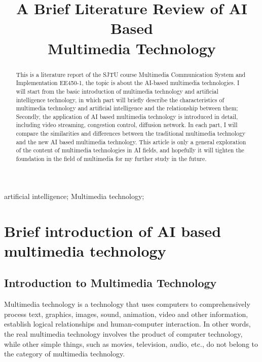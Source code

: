 \documentclass[conference]{IEEEtran}
\begin{document}
\title{A Brief Literature Review of AI Based\\ Multimedia Technology}
\author{

}

\maketitle
\thispagestyle{fancy} 
\lhead{} %
\chead{} %
\rhead{} %
\lfoot{} %
\cfoot{\thepage} %
\rfoot{} %
\renewcommand{\headrulewidth}{0pt} %
\renewcommand{\footrulewidth}{0pt} %
\pagestyle{fancy}
\cfoot{\thepage}

\begin{abstract}
This is a literature report of the SJTU course Multimedia Communication System and Implementation EE450-1, the topic is about the AI-based multimedia technologies. I will start from the basic introduction of multimedia technology and artificial intelligence technology, in which part will briefly describe the characteristics of multimedia technology and artificial intelligence and the relationship between them; Secondly, the application of AI based multimedia technology is introduced in detail, including video streaming, congestion control, diffusion network. In each part, I will compare the similarities and differences between the traditional multimedia technology and the new AI based multimedia technology. This article is only a general exploration of the content of multimedia technologies in AI fields, and hopefully it will tighten the foundation in the field of multimedia for my further study in the future. 
\end{abstract}

\begin{IEEEkeywords}
artificial intelligence; Multimedia technology;
\end{IEEEkeywords}

\section{Brief introduction of AI based multimedia technology}\label{sec1}
\subsection{Introduction to Multimedia Technology}
Multimedia technology is a technology that uses computers to comprehensively process text, graphics, images, sound, animation, video and other information, establish logical relationships and human-computer interaction. In other words, the real multimedia technology involves the product of computer technology, while other simple things, such as movies, television, audio, etc., do not belong to the category of multimedia technology.
\end{document}
